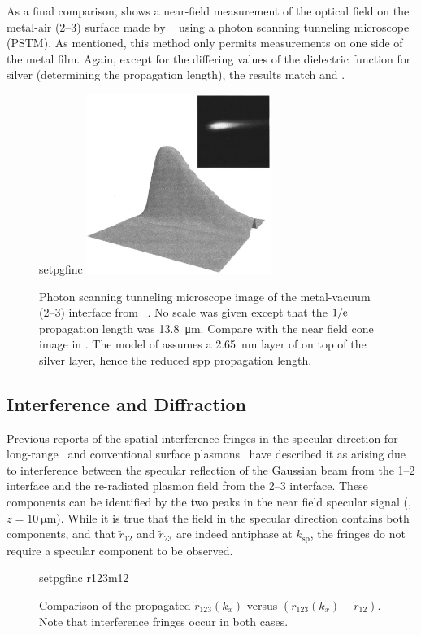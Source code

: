 As a final comparison,  shows a near-field
measurement of the optical field on the metal-air (2--3) surface made by
~\cite{dawson2001surface} using a photon scanning tunneling
microscope (PSTM).  As mentioned, this method only permits measurements on one
side of the metal film.  Again, except for the differing values of the
dielectric function for silver (determining the propagation length), the
results match  and .
\begin{figure}[ht]
\centering
{setpgfinc}
\includegraphics[keepaspectratio,width=6cm]{interference/figures/DawsonTransmitted.png}
\caption{Photon scanning tunneling microscope image of the metal-vacuum (2--3)
				interface from ~\cite{dawson2001surface}.  No scale was
				given except that the $1/{\mathrm{e}}$ propagation length was
				\SI{13.8}{\micro\meter}.  Compare with
				the near field cone image in .  The model of
				 assumes a \SI{2.65}{\nano\meter} layer of  on
				top of the silver layer, hence the reduced \gls{spp} propagation length.}
\label{fig:dawsoncompare}
\end{figure}


\subsection{Interference and Diffraction}
Previous reports of the spatial interference fringes in the specular direction
for long-range~\cite{simon2007observation} and conventional surface
plasmons~\cite{schumann2008near} have described it as arising due to
interference between the specular reflection of the Gaussian beam from the
1--2 interface and the re-radiated plasmon field from the 2--3 interface.
These components can be identified by the two peaks in the near field specular
signal (, $z=\SI{10}{\micro\meter}$).  While it is
true that the field in the specular direction contains both components, and
that $\tilde{r}_{12}$ and $\tilde{r}_{23}$ are indeed antiphase at
$k_\text{sp}$, the fringes do not require a specular component to be observed.
\begin{figure}[ht]
\centering
{setpgfinc}
{r123m12}
\caption{Comparison of the propagated $\tilde{r}_{123}(k_x)$ versus
$(\tilde{r}_{123}(k_x)-\tilde{r}_{12})$.  Note that interference fringes occur in
both cases.  }
\label{fig:r123m12}
\end{figure}

